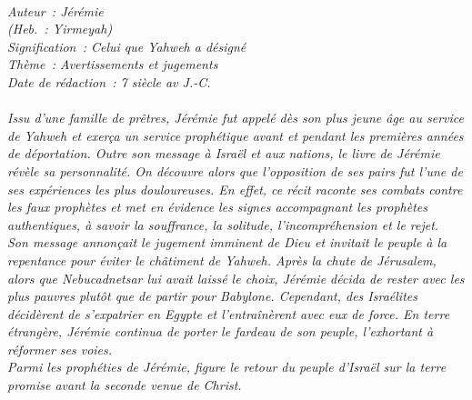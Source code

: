 \BFont
\noindent\hrulefill
{\footnotesize
\textit{
\bigskip
{\centering{}
\\Auteur~: Jérémie
\\(Heb.~: Yirmeyah)
\\Signification~: Celui que Yahweh a désigné
\\Thème~: Avertissements et jugements
\\Date de rédaction~: 7 siècle av J.-C.\\}
}
\textit{
\\Issu d'une famille de prêtres, Jérémie fut appelé dès son plus jeune âge au service de Yahweh et exerça un service prophétique avant et pendant les premières années de déportation. Outre son message à Israël et aux nations, le livre de Jérémie révèle sa personnalité. On découvre alors que l'opposition de ses pairs fut l'une de ses expériences les plus douloureuses. En effet, ce récit raconte ses combats contre les faux prophètes et met en évidence les signes accompagnant les prophètes authentiques, à savoir la souffrance, la solitude, l'incompréhension et le rejet.
\\Son message annonçait le jugement imminent de Dieu et invitait le peuple à la repentance pour éviter le châtiment de Yahweh. Après la chute de Jérusalem, alors que Nebucadnetsar lui avait laissé le choix, Jérémie décida de rester avec les plus pauvres plutôt que de partir pour Babylone. Cependant, des Israélites décidèrent de s'expatrier en Egypte et l'entraînèrent avec eux de force. En terre étrangère, Jérémie continua de porter le fardeau de son peuple, l'exhortant à réformer ses voies.
\\Parmi les prophéties de Jérémie, figure le retour du peuple d'Israël sur la terre promise avant la seconde venue de Christ.\bigskip
}
}
\par\nobreak\noindent\hrulefill

